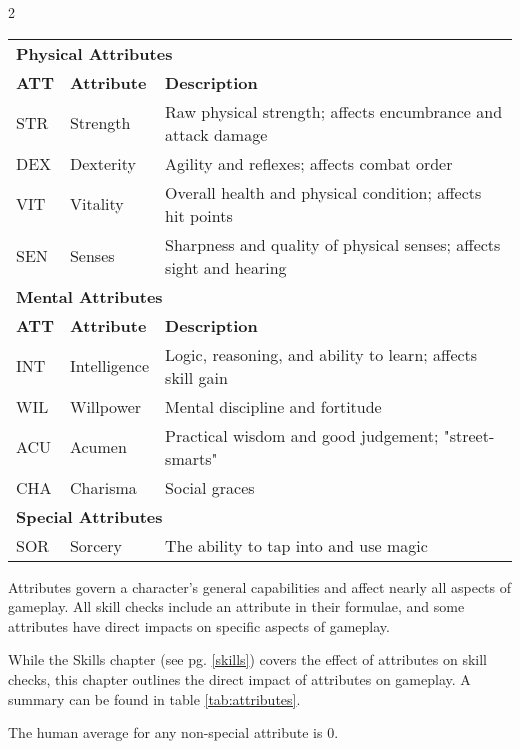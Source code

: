 \begin{multicols*}{2}
    \begin{table*}[ht]
        \unclassedrowcolors
        \begin{tabularx}{\textwidth}{l l X}
            \multicolumn{3}{l}{\textbf{Physical Attributes}} \\
            \textbf{ATT} & \textbf{Attribute} & \textbf{Description} \\
            STR & Strength & Raw physical strength; affects encumbrance and attack damage \\
            DEX & Dexterity & Agility and reflexes; affects combat order \\
            VIT & Vitality & Overall health and physical condition; affects hit points \\
            SEN & Senses & Sharpness and quality of physical senses; affects sight and hearing \\
            \multicolumn{3}{l}{\bfseries{Mental Attributes}} \\
            \textbf{ATT} & \textbf{Attribute} & \textbf{Description} \\
            INT & Intelligence & Logic, reasoning, and ability to learn; affects skill gain \\
            WIL & Willpower & Mental discipline and fortitude \\
            ACU & Acumen & Practical wisdom and good judgement; "street-smarts" \\
            CHA & Charisma & Social graces \\
            \multicolumn{3}{l}{\textbf{Special Attributes}} \\
            SOR & Sorcery & The ability to tap into and use magic \\
        \end{tabularx}
        \caption{Attributes}
        \label{tab:attributes}
    \end{table*}
    Attributes govern a character's general capabilities and affect nearly all
    aspects of gameplay. All skill checks include an attribute in their formulae,
    and some attributes have direct impacts on specific aspects of gameplay.

    While the Skills chapter (see pg. \ref{skills}) covers the effect of attributes
    on skill checks, this chapter outlines the direct impact of attributes on
    gameplay. A summary can be found in table \ref{tab:attributes}.

    The human average for any non-special attribute is 0.


\end{multicols*}
